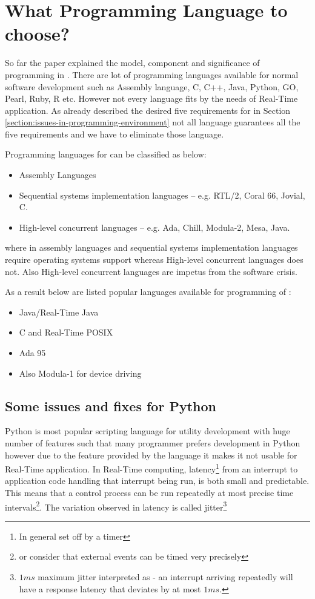 \section{What Programming Language to choose?}\label{section:choose-programming=language}
So far the paper explained the \rtsS model, component and significance of programming in \rts.
There are lot of programming languages available for normal software development such as Assembly language, C, C++, Java, Python, GO, Pearl, Ruby, R etc. However not every language fits by the needs of Real-Time application. As already described the desired five requirements for \rtsS in Section \ref{section:issues-in-programming-environment} not all language guarantees all the five requirements and we have to eliminate those language.

Programming languages for \rtsS can be classified as below:
\begin{itemize}
    \item Assembly Languages
    \item Sequential systems implementation languages -- e.g. RTL/2, Coral 66, Jovial, C.
    \item High-level concurrent languages -- e.g. Ada, Chill, Modula-2, Mesa, Java.
\end{itemize}
where in assembly languages and sequential systems implementation languages require operating systems support whereas High-level concurrent languages does not. Also High-level concurrent languages are impetus from the software crisis.

As a result below are listed popular languages available for programming of \rts:
\begin{itemize}
    \item Java/Real-Time Java 
    \item C and Real-Time POSIX
    \item Ada 95
    \item Also Modula-1 for device driving
\end{itemize}

\subsection{Some issues and fixes for Python}
Python is most popular scripting language for utility development with huge number of features such that many programmer prefers development in Python however due to the feature provided by the language it makes it not usable for Real-Time application.
In Real-Time computing, latency\footnote{In general set off by a timer} from an interrupt to application code handling that interrupt being run, is both small and predictable. This means that a control process can be run  repeatedly at most precise time intervals\footnote{or consider that external events can be timed very precisely}. The variation observed in latency is called jitter\footnote{$ 1ms $ maximum jitter interpreted as - an interrupt arriving repeatedly will have a response latency that deviates by at most $ 1ms $.}

